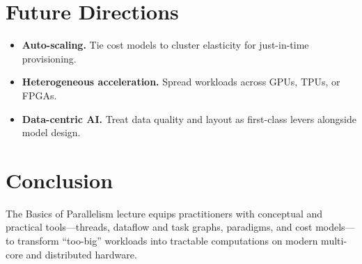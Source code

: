 \documentclass[11pt]{article}
\begin{document}
\section{Future Directions}

\begin{itemize}[itemsep=0pt]
  \item \textbf{Auto-scaling.} Tie cost models to cluster elasticity for just-in-time provisioning.
  \item \textbf{Heterogeneous acceleration.} Spread workloads across GPUs, TPUs, or FPGAs.
  \item \textbf{Data-centric AI.} Treat data quality and layout as first-class levers alongside model design.
\end{itemize}

\section*{Conclusion}

The Basics of Parallelism lecture equips practitioners with conceptual and practical tools—threads, dataflow and task graphs, paradigms, and cost models—to transform “too-big” workloads into tractable computations on modern multi-core and distributed hardware.
\end{document}
